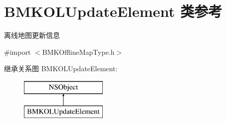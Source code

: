 \hypertarget{interface_b_m_k_o_l_update_element}{\section{B\-M\-K\-O\-L\-Update\-Element 类参考}
\label{interface_b_m_k_o_l_update_element}
}


离线地图更新信息  




{\ttfamily \#import $<$B\-M\-K\-Offline\-Map\-Type.\-h$>$}

继承关系图 B\-M\-K\-O\-L\-Update\-Element\-:\begin{figure}[H]
\begin{center}
\leavevmode
\includegraphics[height=2.000000cm]{interface_b_m_k_o_l_update_element}
\end{center}
\end{figure}
